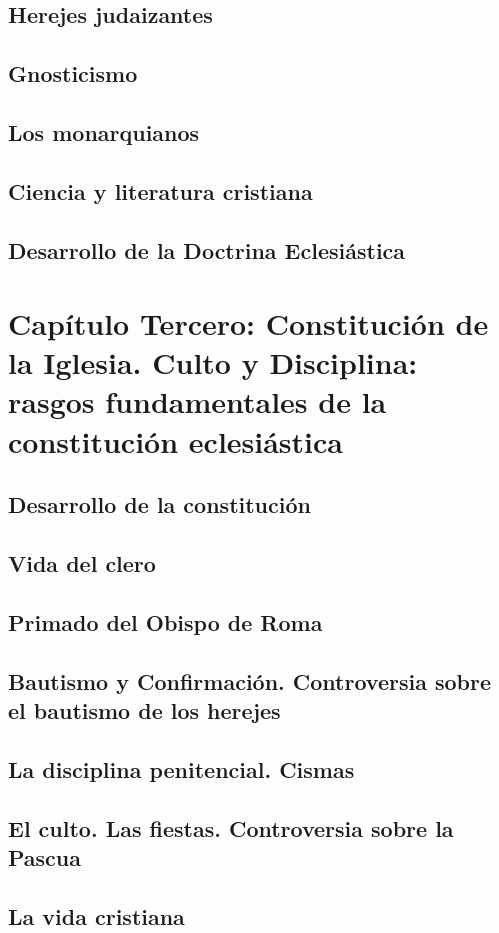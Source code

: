 \raggedbottom{} \documentclass[12pt, a4paper]{book}
\begin{document}
\section{Herejes judaizantes}
\section{Gnosticismo}
\section{Los monarquianos}
\section{Ciencia y literatura cristiana}
\section{Desarrollo de la Doctrina Eclesiástica}
\chapter{Capítulo Tercero: Constitución de la Iglesia. Culto y Disciplina: rasgos fundamentales de la constitución eclesiástica}
\section{Desarrollo de la constitución}
\section{Vida del clero}
\section{Primado del Obispo de Roma}
\section{Bautismo y Confirmación. Controversia sobre el bautismo de los herejes}
\section{La disciplina penitencial. Cismas}
\section{El culto. Las fiestas. Controversia sobre la Pascua}
\section{La vida cristiana}
\end{document}
